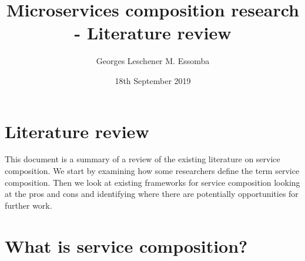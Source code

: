 \documentclass{article}
\begin{document}
\author{Georges Leschener M. Essomba}
\title{Microservices composition research - Literature review}
\date{18th September 2019} %

\maketitle{} %

\pagebreak %
\tableofcontents %
\pagebreak %




\section{Literature review}


This document is a summary of a review of the existing literature on service composition. We start by examining how some researchers define the term service composition. Then we look at existing frameworks for service composition looking at the pros and cons and identifying where there are potentially opportunities for further work.

\section{What is service composition?}
\end{document}
